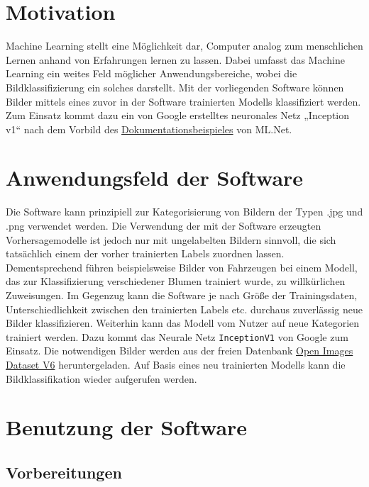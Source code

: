 \documentclass[doktyp=parbeit]{TUBAFarbeiten}
\begin{document}
	
	\maketitle
	
	\tableofcontents
\section{Motivation}
Machine Learning stellt eine Möglichkeit dar, Computer analog zum menschlichen Lernen anhand von Erfahrungen lernen zu lassen. Dabei umfasst das Machine Learning ein weites Feld möglicher Anwendungsbereiche, wobei die Bildklassifizierung ein solches darstellt. Mit der vorliegenden Software können Bilder mittels eines zuvor in der Software trainierten Modells klassifiziert werden. 
Zum Einsatz kommt dazu ein von Google erstelltes neuronales Netz „Inception v1“ nach dem Vorbild des \href{https://docs.microsoft.com/de-de/dotnet/machine-learning/tutorials/image-classification}{Dokumentationsbeispieles} von ML.Net.
\section{Anwendungsfeld der Software}
Die Software kann prinzipiell zur Kategorisierung von Bildern der Typen .jpg und .png verwendet werden. Die Verwendung der mit der Software erzeugten Vorhersagemodelle ist jedoch nur mit ungelabelten Bildern sinnvoll, die sich tatsächlich einem der vorher trainierten Labels zuordnen lassen. Dementsprechend führen beispielsweise Bilder von Fahrzeugen bei einem Modell, das zur Klassifizierung verschiedener Blumen trainiert wurde, zu willkürlichen Zuweisungen.
Im Gegenzug kann die Software je nach Größe der Trainingsdaten, Unterschiedlichkeit zwischen den trainierten Labels etc. durchaus zuverlässig neue Bilder klassifizieren. 
Weiterhin kann das Modell vom Nutzer auf neue Kategorien trainiert werden. Dazu kommt das Neurale Netz \texttt{InceptionV1} von Google zum Einsatz. Die notwendigen Bilder werden aus der freien Datenbank \href{https://storage.googleapis.com/openimages/web/index.html}{Open Images Dataset V6} heruntergeladen. Auf Basis eines neu trainierten Modells kann die Bildklassifikation wieder aufgerufen werden.
\section{Benutzung der Software}
\subsection{Vorbereitungen}
\end{document}
